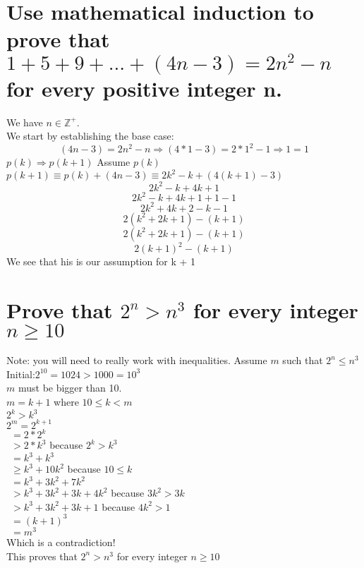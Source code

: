 \section{Use mathematical induction to prove that $1+5+9+...+(4n-3)=2n^2-n$ for every positive integer n.}
We have $n\in \mathbb{Z}^{+}$.\\
We start by establishing the base case:
\begin{equation}
(4n-3) = 2n^2-n \Rightarrow (4*1-3) = 2*1^2-1 \Rightarrow 1 = 1
\end{equation}
$p(k)\Rightarrow p(k+1)$
Assume $p(k)$\\
$p(k+1) \equiv p(k)+(4n-3) \equiv 2k^2-k+(4(k+1)-3)$\\
\begin{equation}
2k^2-k+4k+1
\end{equation}
\begin{equation}
2k^2-k+4k+1+1-1
\end{equation}
\begin{equation}
2k^2+4k+2-k-1
\end{equation}
\begin{equation}
2(k^2+2k+1)-(k+1)
\end{equation}
\begin{equation}
2(k^2+2k+1)-(k+1)
\end{equation}
\begin{equation}
2(k+1)^2-(k+1)
\end{equation}
We see that his is our assumption for k + 1


\section{Prove that $2^n>n^3$ for every integer $n\geq 10$}
Note: you will need to really work with inequalities.
Assume $m$ such that $2^n\leq n^3$\\
Initial:$2^{10}=1024 > 1000 = 10^3$\\
$m$ must be bigger than 10.\\
$m = k + 1$ where $10\leq k < m$\\
$2^k > k^3$\\
$2^m = 2^{k+1}$\\
$\ \ = 2*2^k$\\
$\ \ > 2*k^3$ because $2^k > k^3$\\
$\ \ = k^3+k^3$\\
$\ \ \geq k^3+10k^2$ because $10\leq k$\\
$\ \ =k^3+3k^2+7k^2$\\
$\ \ >k^3+3k^2+3k+4k^2$ because $3k^2 > 3k$\\
$\ \ >k^3+3k^2+3k+1$ because $4k^2 > 1$\\
$\ \ =(k+1)^3$\\
$\ \ =m^3$\\
Which is a contradiction!\\
This proves that $2^n > n^3$ for every integer $n\geq 10$
